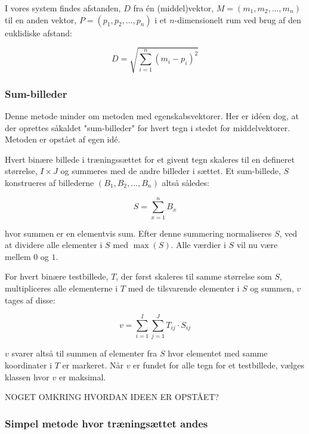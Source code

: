 I vores system findes afstanden, $D$ fra én (middel)vektor, $M = (m_{1},m_{2},...,m_{n})$ til en anden vektor, $P = (p_{1},p_{2},...,p_{n})$ i et $n$-dimensionelt rum ved brug af den euklidiske afstand\cite{wiki_euclid}:

\begin{displaymath}
	D = \sqrt{\sum_{i=1}^{n}(m_{i}-p_{i})^{2}}
\end{displaymath}

\subsubsection{Sum-billeder}

Denne metode minder om metoden med egenskabsvektorer. Her er idéen dog, at der oprettes såkaldet "sum-billeder" for hvert tegn i stedet for middelvektorer. Metoden er opstået af egen idé.

Hvert binære billede i træningssættet for et givent tegn skaleres til en defineret størrelse, $I \times J$ og summeres med de andre billeder i sættet. Et sum-billede, $S$ konstrueres af billederne $(B_{1},B_{2},...,B_{n})$ altså således:

\begin{displaymath}
	S = \sum_{x=1}^n{B_x}
\end{displaymath}

hvor summen er en elementvis sum. Efter denne summering normaliseres $S$, ved at dividere alle elementer i $S$ med $\max{(S)}$. Alle værdier i $S$ vil nu være mellem $0$ og $1$.

For hvert binære testbillede, $T$, der først skaleres til samme størrelse som $S$, multipliceres alle elementerne i $T$ med de tilsvarende elementer i $S$ og summen, $v$ tages af disse:

\begin{displaymath}
	v = \sum_{i=1}^I{\sum_{j=1}^J{T_{ij} \cdot S_{ij}}}
\end{displaymath}

$v$ svarer altså til summen af elementer fra $S$ hvor elementet med samme koordinater i $T$ er markeret. Når $v$ er fundet for alle tegn for et testbillede, vælges klassen hvor $v$ er maksimal.

NOGET OMKRING HVORDAN IDEEN ER OPSTÅET?

\subsubsection{Simpel metode hvor træningsættet andes}

